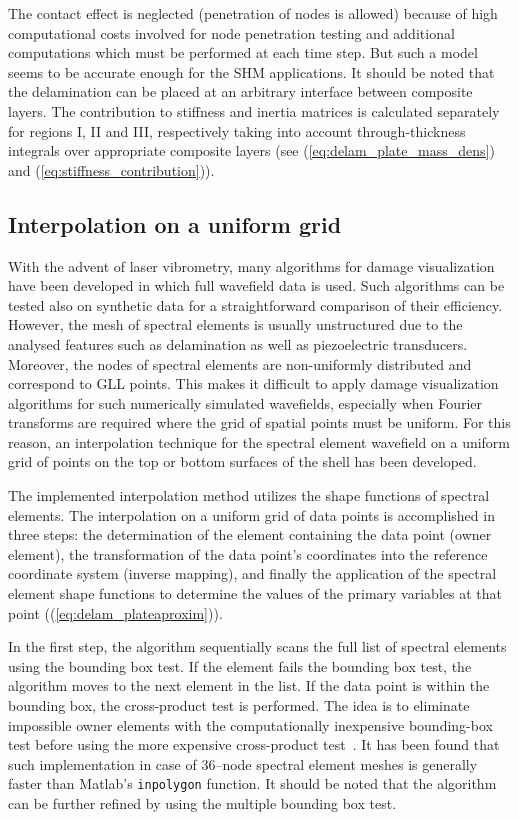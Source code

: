 \documentclass[12pt]{iopart}
\begin{document}
The contact effect is neglected (penetration of nodes is allowed) because of high computational costs involved for node penetration testing and additional computations which must be performed at each time step.
But such a model seems to be accurate enough for the SHM applications. It should be noted that the delamination can be placed at an arbitrary interface between composite layers. The contribution to stiffness and inertia matrices is calculated separately for regions I, II and III, respectively taking into account through-thickness integrals over appropriate composite layers (see (\ref{eq:delam_plate_mass_dens}) and (\ref{eq:stiffness_contribution})).

\subsection{Interpolation on a uniform grid}

With the advent of laser vibrometry, many algorithms for damage visualization have been developed in which full wavefield data is used. Such algorithms can be tested also on synthetic data for a straightforward comparison of their efficiency. However, the mesh of spectral elements is usually unstructured due to the analysed features such as delamination as well as piezoelectric transducers. Moreover, the nodes of spectral elements are non-uniformly distributed and correspond to GLL points. This makes it difficult to apply damage visualization algorithms for such numerically simulated wavefields, especially when Fourier transforms are required where the grid of spatial points must be uniform. For this reason, an interpolation technique for the spectral element wavefield on a uniform grid of points on the top or bottom surfaces of the shell has been developed. 

The implemented interpolation method utilizes the shape functions of spectral elements. The interpolation on a uniform grid of data points is accomplished in three steps: the determination of the element containing the data point (owner element), the transformation of the data point’s coordinates into the reference coordinate system (inverse mapping), and finally the application of the spectral element shape functions to determine the values of the primary variables at that point ((\ref{eq:delam_plateaproxim})).

In the first step, the algorithm sequentially scans the full list of spectral elements using the bounding box test. If the element fails the bounding box test, the algorithm moves to the next element in the list. If the data point is within the bounding box, the cross-product test is performed. The idea is to eliminate impossible owner elements with the computationally inexpensive bounding-box test before using the more expensive cross-product test~\cite{Silva2009}. It has been found that such implementation in case of 36--node spectral element meshes is generally faster than Matlab's \verb|inpolygon| function. It should be noted that the algorithm can be further refined by using the multiple bounding box test.
\end{document}
